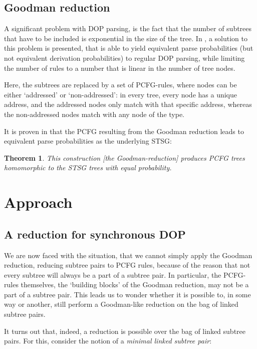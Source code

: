 \documentclass[a4paper]{article}
\newtheorem{theorem}{Theorem}[section]
\theoremstyle{definition}
\begin{document}
{{\subsection{Goodman reduction}

A significant problem with DOP parsing, is the fact that the number of subtrees
that have to be included is exponential in the size of the tree. In \cite{Go},
a solution to this problem is presented, that is able to yield equivalent parse
probabilities (but not equivalent derivation probabilities) to regular DOP
parsing, while limiting the number of rules to a number that is linear in the
number of tree nodes.

Here, the subtrees are replaced by a set of PCFG-rules, where nodes can be
either `addressed' or `non-addressed': in every tree, every node has a unique
address, and the addressed nodes only match with that specific address, whereas
the non-addressed nodes match with any node of the type.

It is proven in \cite{Go} that the PCFG resulting from the Goodman reduction
leads to equivalent parse probabilities as the underlying STSG:

\begin{theorem}
This construction [the Goodman-reduction] produces PCFG trees homomorphic to
the STSG trees with equal probability.
\end{theorem}

\section{Approach}
\label{sec:approach}

\subsection{A reduction for synchronous DOP}

We are now faced with the situation, that we cannot simply apply the Goodman
reduction, reducing subtree pairs to PCFG rules, because of the reason that not
every subtree will always be a part of a subtree pair. In particular, the
PCFG-rules themselves, the `building blocks' of the Goodman reduction, may not
be a part of a subtree pair. This leads us to wonder whether it is possible to,
in some way or another, still perform a Goodman-like reduction on the bag of
linked subtree pairs.

It turns out that, indeed, a reduction is possible over the bag of linked
subtree pairs. For this, consider the notion of a \emph{minimal linked subtree
pair}:

}}
\end{document}
